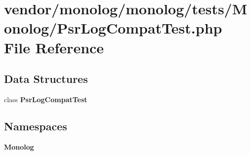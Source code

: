 \section{vendor/monolog/monolog/tests/\+Monolog/\+Psr\+Log\+Compat\+Test.php File Reference}
\label{_psr_log_compat_test_8php}
\subsection*{Data Structures}
\begin{DoxyCompactItemize}
\item 
class {\bf Psr\+Log\+Compat\+Test}
\end{DoxyCompactItemize}
\subsection*{Namespaces}
\begin{DoxyCompactItemize}
\item 
 {\bf Monolog}
\end{DoxyCompactItemize}

